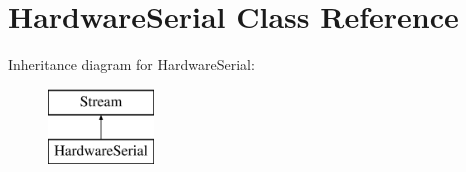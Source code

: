 \hypertarget{class_hardware_serial}{}\section{Hardware\+Serial Class Reference}
\label{class_hardware_serial}
Inheritance diagram for Hardware\+Serial\+:\begin{figure}[H]
\begin{center}
\leavevmode
\includegraphics[height=2.000000cm]{class_hardware_serial}
\end{center}
\end{figure}
